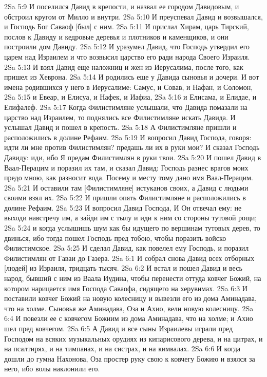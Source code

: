 2Sa 5:9  И поселился Давид в крепости, и назвал ее городом Давидовым, и обстроил кругом от Милло и внутри.
2Sa 5:10  И преуспевал Давид и возвышался, и Господь Бог Саваоф [был] с ним.
2Sa 5:11  И прислал Хирам, царь Тирский, послов к Давиду и кедровые деревья и плотников и каменщиков, и они построили дом Давиду.
2Sa 5:12  И уразумел Давид, что Господь утвердил его царем над Израилем и что возвысил царство его ради народа Своего Израиля.
2Sa 5:13  И взял Давид еще наложниц и жен из Иерусалима, после того, как пришел из Хеврона.
2Sa 5:14  И родились еще у Давида сыновья и дочери. И вот имена родившихся у него в Иерусалиме: Самус, и Совав, и Нафан, и Соломон,
2Sa 5:15  и Евеар, и Елисуа, и Нафек, и Иафиа,
2Sa 5:16  и Елисама, и Елидае, и Елифалеф.
2Sa 5:17  Когда Филистимляне услышали, что Давида помазали на царство над Израилем, то поднялись все Филистимляне искать Давида. И услышал Давид и пошел в крепость.
2Sa 5:18  А Филистимляне пришли и расположились в долине Рефаим.
2Sa 5:19  И вопросил Давид Господа, говоря: идти ли мне против Филистимлян? предашь ли их в руки мои? И сказал Господь Давиду: иди, ибо Я предам Филистимлян в руки твои.
2Sa 5:20  И пошел Давид в Ваал-Перацим и поразил их там, и сказал Давид: Господь разнес врагов моих предо мною, как разносит вода. Посему и месту тому дано имя Ваал-Перацим.
2Sa 5:21  И оставили там [Филистимляне] истуканов своих, а Давид с людьми своими взял их.
2Sa 5:22  И пришли опять Филистимляне и расположились в долине Рефаим.
2Sa 5:23  И вопросил Давид Господа, И Он отвечал ему: не выходи навстречу им, а зайди им с тылу и иди к ним со стороны тутовой рощи;
2Sa 5:24  и когда услышишь шум как бы идущего по вершинам тутовых дерев, то двинься, ибо тогда пошел Господь пред тобою, чтобы поразить войско Филистимское.
2Sa 5:25  И сделал Давид, как повелел ему Господь, и поразил Филистимлян от Гаваи до Газера.
2Sa 6:1  И собрал снова Давид всех отборных [людей] из Израиля, тридцать тысяч.
2Sa 6:2  И встал и пошел Давид и весь народ, бывший с ним из Ваала Иудина, чтобы перенести оттуда ковчег Божий, на котором нарицается имя Господа Саваофа, сидящего на херувимах.
2Sa 6:3  И поставили ковчег Божий на новую колесницу и вывезли его из дома Аминадава, что на холме. Сыновья же Аминадава, Оза и Ахио, вели новую колесницу.
2Sa 6:4  И повезли ее с ковчегом Божиим из дома Аминадава, что на холме; и Ахио шел пред ковчегом.
2Sa 6:5  А Давид и все сыны Израилевы играли пред Господом на всяких музыкальных орудиях из кипарисового дерева, и на цитрах, и на псалтирях, и на тимпанах, и на систрах, и на кимвалах.
2Sa 6:6  И когда дошли до гумна Нахонова, Оза простер руку свою к ковчегу Божию и взялся за него, ибо волы наклонили его.
